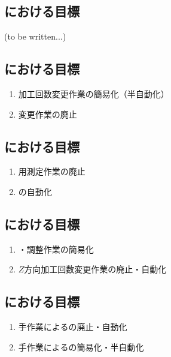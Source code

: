 \subsection{\DimpleMilling における目標\TBW}
(to be written...)


\subsection{\EndFacecutMilling における目標}
\begin{enumerate}
\item 加工回数変更作業の簡易化（半自動化）
\item \TDCValue 変更作業の廃止
\end{enumerate}


\subsection{\OutcutMilling における目標}
\begin{enumerate}
\item \CurvedOutcut 用測定作業の廃止
\item \CurvedOutcutMilling の自動化
\end{enumerate}


\subsection{\KeywayMilling における目標}
\begin{enumerate}
\item \KeywayPos・\KeywayWidth 調整作業の簡易化
\item $Z$方向加工回数変更作業の廃止・自動化
\end{enumerate}


\subsection{\EndFaceChamferMilling における目標}
\begin{enumerate}
\item 手作業による\EndFaceCChamferMilling の廃止・自動化
\item 手作業による\EndFaceRChamferMilling の簡易化・半自動化
\end{enumerate}


